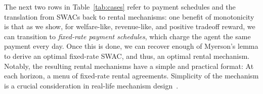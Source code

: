 \documentclass[11pt,letterpaper]{article}
\newcommand{\fr}{fixed-rate\xspace}
\newcommand{\swac}{SWAC\xspace}
\newcommand{\swacs}{SWACs\xspace}
\theoremstyle{plain}
\begin{document}
The next two rows in Table~\ref{tab:cases} refer to
payment schedules and the translation from \swacs back to rental mechanisms: 
one benefit of monotonicity is that as we show,
for welfare-like, revenue-like, and positive tradeoff reward,
we can
transition to \emph{\fr payment schedules}, which %
charge the agent the same payment every day.
Once this is done, we can recover enough of Myerson's lemma to derive an optimal fixed-rate \swac, and thus, an optimal rental mechanism. Notably, the resulting rental mechanisms have a simple and practical format: At each horizon, a menu of fixed-rate rental agreements. 
Simplicity of the mechanism is a crucial consideration in real-life mechanism design~\cite{hartline2009simple}.


\end{document}

